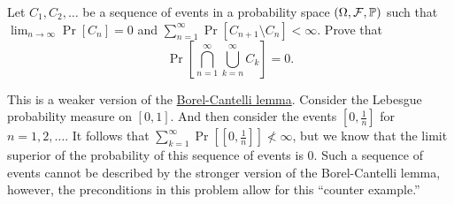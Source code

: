 \begin{problem}{14} 
    Let $C_1,C_2,\ldots$ be a sequence of events in a probability space $(\Omega, \mathcal{F}, \mathbb{P})$ such that $\lim_{n\to\infty} \Pr[C_n] = 0$ and $\sum_{n=1}^\infty \Pr[C_{n+1}\setminus C_n] < \infty$. Prove that \[
        \Pr\left[\bigcap_{n=1}^\infty\bigcup_{k=n}^\infty C_k\right] = 0.  
    \] 
\end{problem}
\begin{solution}
    This is a weaker version of the \href{https://en.wikipedia.org/wiki/Borel-Cantelli_lemma}{Borel-Cantelli lemma}. Consider the Lebesgue probability measure on $[0,1]$. And then consider the events $\left[0,\frac{1}{n}\right]$ for $n = 1,2,\ldots$. It follows that $\sum_{k=1}^\infty \Pr\left[\left[0,\frac{1}{n}\right]\right] \not < \infty$, but we know that the limit superior of the probability of this sequence of events is 0. Such a sequence of events cannot be described by the stronger version of the Borel-Cantelli lemma, however, the preconditions in this problem allow for this ``counter example.''


\end{solution}
